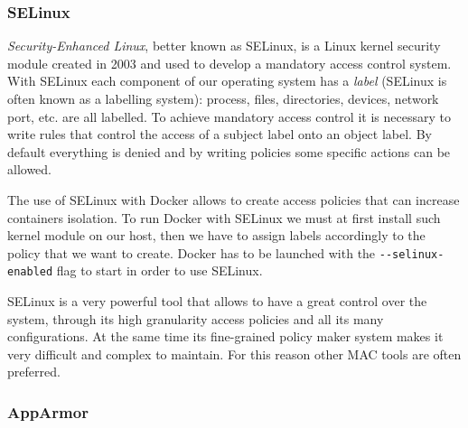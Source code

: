 \documentclass[a4paper,12pt]{article}
\newcommand{\code}[1]{\lstinline|#1|}
\begin{document}
\subsubsection{SELinux}

\textit{Security-Enhanced Linux}, better known as SELinux, is a Linux kernel
security module created in 2003 and used to develop a mandatory access control
system. With SELinux each component of our operating system has a \textit{label}
(SELinux is often known as a labelling system): process, files, directories,
devices, network port, etc. are all labelled. To achieve mandatory access
control it is necessary to write rules that control the access of a subject
label onto an object label. By default everything is denied and by writing
policies some specific actions can be allowed. \par The use of SELinux with Docker allows
to create access policies that can increase containers isolation. To run Docker
with SELinux we must at first install such kernel module on our host, then we
have to assign labels accordingly to the policy that we want to create. Docker
has to be launched with the \code{--selinux-enabled} flag to start in order to
use SELinux. \par SELinux is a very powerful tool that allows to have a great
control over the system, through its high granularity access policies and all
its many configurations. At the same time its fine-grained policy maker system
makes it very difficult and complex to maintain. For this reason other MAC tools
are often preferred.

\subsubsection{AppArmor}
\end{document}
